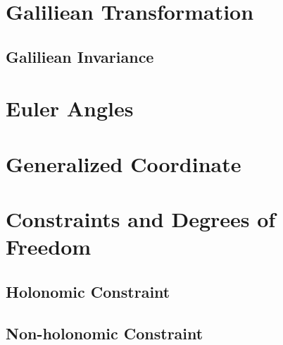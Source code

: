 \section{Galiliean Transformation}
\subsection{Galiliean Invariance}

\section{Euler Angles}

\section{Generalized Coordinate}

\section{Constraints and Degrees of Freedom}
\subsection{Holonomic Constraint}
\subsection{Non-holonomic Constraint}